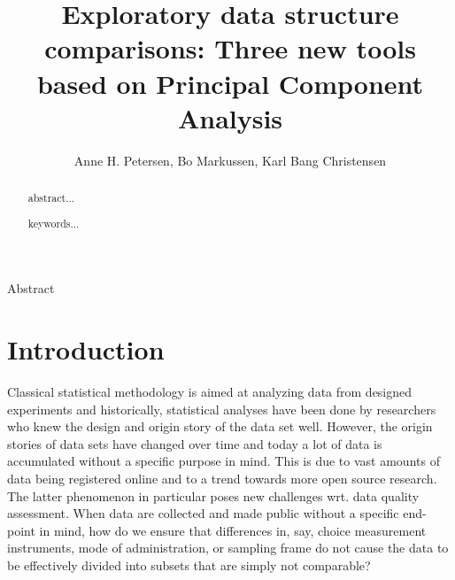 \documentclass[titlepage,11pt,twoside]{article}
\begin{document}

\title{Exploratory data structure comparisons: Three new tools based on Principal Component Analysis}

\author{Anne H. Petersen, Bo Markussen, Karl Bang Christensen}



\vspace{\fill}






\begin{center}\vskip3pt


\vspace{32pt}

Abstract\vskip3pt

\end{center}


\begin{abstract}
abstract...
\begin{keywords}
keywords...
\end{keywords}
\end{abstract}

\vspace{\fill}\newpage

\section{Introduction}
\label{sec:introduction}

Classical statistical methodology is aimed at analyzing data from designed experiments and historically, statistical analyses have been done by researchers who knew the design and origin story of the data set well. However, the origin stories of data sets have changed over time and today a lot of data is accumulated without a specific purpose in mind. This is due to vast amounts of data being registered online and to a trend towards more open source research. The latter phenomenon in particular poses new challenges wrt. data quality assessment. When data are collected and made public without a specific end-point in mind, how do we ensure that differences in, say, choice measurement instruments, mode of administration, or sampling frame do not cause the data to be effectively divided into subsets that are simply not comparable?
\end{document}
